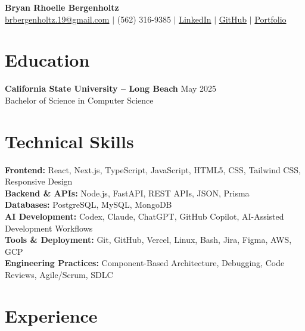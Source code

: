 \documentclass[a4paper,10pt]{article}
\newcommand{\dateright}[1]{%
  \hfill{\small\textnormal{#1}}%
}
\begin{document}

\begin{center}
  {\LARGE\textbf{Bryan Rhoelle Bergenholtz}}\\[-1pt]
  \href{mailto:brbergenholtz.19@gmail.com}
  {brbergenholtz.19@gmail.com}
  $|$ (562) 316-9385
  $|$ \href{https://linkedin.com/in/bryanbergenholtz}{LinkedIn}
  $|$ \href{https://github.com/YanRho}{GitHub}
  $|$ \href{https://yanrho.vercel.app/}{Portfolio}
\end{center}

\vspace{-6pt}

\section*{Education}

\textbf{California State University -- Long Beach}
\dateright{May 2025}\\[-1pt]
Bachelor of Science in Computer Science

\section*{Technical Skills}

\textbf{Frontend:}
React, Next.js, TypeScript, JavaScript, HTML5, CSS, Tailwind CSS, Responsive Design\\
\textbf{Backend \& APIs:}
Node.js, FastAPI, REST APIs, JSON, Prisma\\
\textbf{Databases:}
PostgreSQL, MySQL, MongoDB\\
\textbf{AI Development:}
Codex, Claude, ChatGPT, GitHub Copilot, AI-Assisted Development Workflows\\
\textbf{Tools \& Deployment:}
Git, GitHub, Vercel, Linux, Bash, Jira, Figma, AWS, GCP\\
\textbf{Engineering Practices:}
Component-Based Architecture, Debugging, Code Reviews, Agile/Scrum, SDLC

\section*{Experience}
\end{document}
